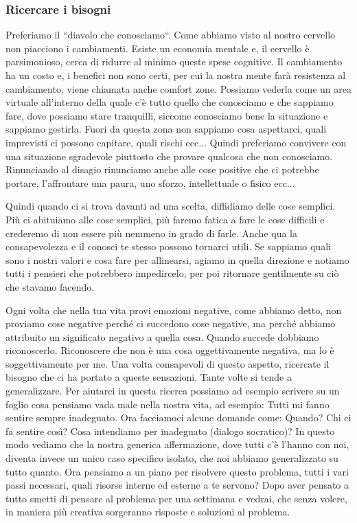 \documentclass[12pt]{book} %
\begin{document}
\subsubsection{Ricercare i bisogni}
Preferiamo il “diavolo che conosciamo“. Come abbiamo visto al nostro cervello non piacciono i cambiamenti. Esiste un
economia mentale e, il cervello è parsimonioso, cerca di ridurre al minimo queste spese cognitive. Il cambiamento ha un
costo e, i benefici non sono certi, per cui la nostra mente farà resistenza al cambiamento, viene chiamata anche
comfort zone. Possiamo vederla come un area virtuale all'interno della quale c'è tutto quello che conosciamo e che
sappiamo fare, dove possiamo stare tranquilli, siccome conosciamo bene la situazione e sappiamo gestirla. Fuori da
questa zona non sappiamo cosa aspettarci, quali imprevisti ci possono capitare, quali rischi ecc... Quindi preferiamo
convivere con una situazione sgradevole piuttosto che provare qualcosa che non conosciamo. Rinunciando al disagio
rinunciamo anche alle cose positive che ci potrebbe portare, l'affrontare una paura, uno sforzo,
intellettuale o fisico ecc...

Quindi quando ci si trova davanti ad una scelta, diffidiamo delle cose semplici. Più ci abituiamo alle cose semplici,
più faremo fatica a fare le cose difficili e crederemo di non essere più nemmeno in grado di farle. Anche qua la
consapevolezza e il conosci te stesso possono tornarci utili. Se sappiamo quali sono i nostri valori e cosa fare per
allinearsi, agiamo in quella direzione e notiamo tutti i pensieri che potrebbero impedircelo, per poi ritornare
gentilmente su ciò che stavamo facendo.

Ogni volta che nella tua vita provi emozioni negative, come abbiamo detto, non proviamo cose negative perché ci
succedono cose negative, ma perché abbiamo attribuito un significato negativo a quella cosa. Quando succede dobbiamo
riconoscerlo. Riconoscere che non è una cosa oggettivamente negativa, ma lo è soggettivamente per me. Una volta
consapevoli di questo aspetto, ricercate il bisogno che ci ha portato a queste sensazioni. Tante volte si tende a
generalizzare. Per aiutarci in questa ricerca possiamo ad esempio scrivere su un foglio cosa pensiamo vada male nella
nostra vita, ad esempio: Tutti mi fanno sentire sempre inadeguato. Ora facciamoci alcune domande come: Quando? Chi ci
fa sentire così? Cosa intendiamo per inadeguato (dialogo socratico)? In questo modo vediamo che la nostra generica
affermazione, dove tutti c'è l'hanno con noi, diventa invece un unico caso specifico isolato, che noi abbiamo
generalizzato su tutto quanto. Ora pensiamo a un piano per risolvere questo problema, tutti i vari passi necessari,
quali risorse interne ed esterne a te servono? Dopo aver pensato a tutto smetti di pensare al problema per una
settimana e vedrai, che senza volere, in maniera più creativa sorgeranno risposte e soluzioni al problema.
\end{document}
